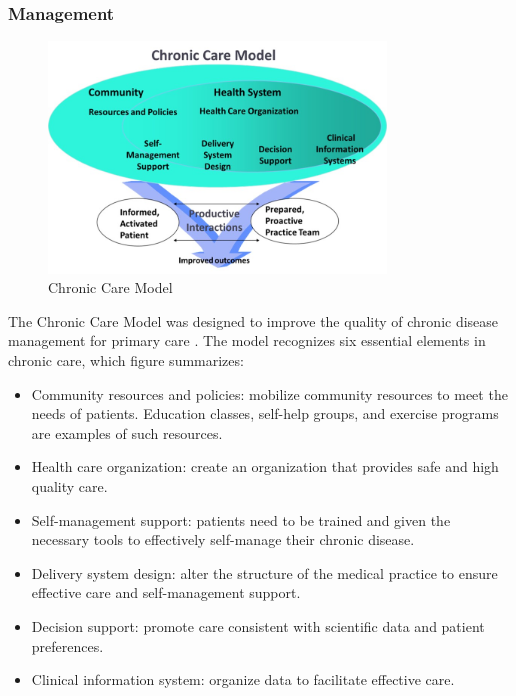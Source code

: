         \subsubsection{Management}

        \begin{figure}[!t]
            \centering
            \includegraphics[width=0.8\textwidth]{chapters/2_background/chronic_model}
            \caption{Chronic Care Model}\label{fig:chronic_care}
        \end{figure}

        The Chronic Care Model was designed to improve the quality of chronic disease management for primary care \cite{bodenheimer2002improving}. The model recognizes six essential elements in chronic care, which figure  summarizes:
        \begin{itemize}
            \item Community resources and policies: mobilize community resources to meet the needs of patients. Education classes, self-help groups, and exercise programs are examples of such resources.
            \item Health care organization: create an organization that provides safe and high quality care. 
            \item Self-management support: patients need to be trained and given the necessary tools to effectively self-manage their chronic disease.
            \item Delivery system design: alter the structure of the medical practice to ensure effective care and self-management support.
            \item Decision support: promote care consistent with scientific data and patient preferences.
            \item Clinical information system: organize data to facilitate effective care.
        \end{itemize}

